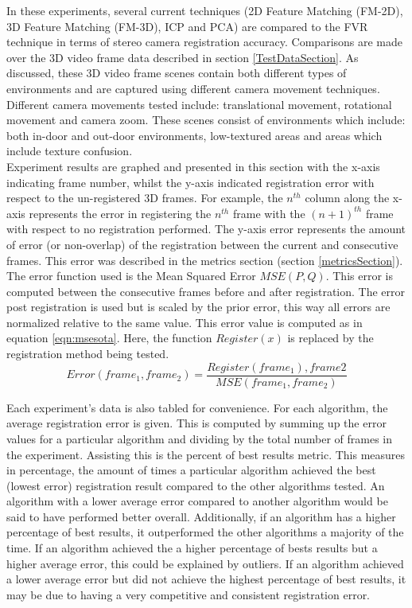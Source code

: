
In these experiments, several current techniques (2D Feature Matching (FM-2D), 3D Feature Matching (FM-3D), ICP and PCA) are compared to the FVR technique in terms of stereo camera registration accuracy. Comparisons are made over the 3D video frame data described in section \ref{TestDataSection}. As discussed, these 3D video frame scenes contain both different types of environments and are captured using different camera movement techniques. Different camera movements tested include: translational movement, rotational movement and camera zoom. These scenes consist of environments which include: both in-door and out-door environments, low-textured areas and areas which include texture confusion. \\

Experiment results are graphed and presented in this section with the x-axis indicating frame number, whilst the y-axis indicated registration error with respect to the un-registered 3D frames. For example, the $n^{th}$ column along the x-axis represents the error in registering the $n^{th}$ frame with the $(n+1)^{th}$ frame with respect to no registration performed. The y-axis error represents the amount of error (or non-overlap) of the registration between the current and consecutive frames. This error was described in the metrics section (section \ref{metricsSection}). The error function used is the Mean Squared Error $MSE(P,Q)$. This error is computed between the consecutive frames before and after registration. The error post registration is used but is scaled by the prior error, this way all errors are normalized relative to the same value. This error value is computed as in equation \ref{eqn:msesota}. Here, the function $Register(x)$ is replaced by the registration method being tested. \\

\begin{equation} \label{eqn:msesota}
Error(frame_1, frame_2) =  \frac{Register(frame_1), frame2}{MSE(frame_1,frame_2)}
\end{equation}


Each experiment's data is also tabled for convenience. For each algorithm, the average registration error is given. This is computed by summing up the error values for a particular algorithm and dividing by the total number of frames in the experiment. Assisting this is the percent of best results metric. This measures in percentage, the amount of times a particular algorithm achieved the best (lowest error) registration result compared to the other algorithms tested. An algorithm with a lower average error compared to another algorithm would be said to have performed better overall. Additionally, if an algorithm has a higher percentage of best results, it outperformed the other algorithms a majority of the time. If an algorithm achieved the a higher percentage of bests results but a higher average error, this could be explained by outliers. If an algorithm achieved a lower average error but did not achieve the highest percentage of best results, it may be due to having a very competitive and consistent registration error. \\

